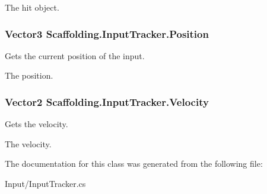 The hit object.\hypertarget{class_scaffolding_1_1_input_tracker_afc147aaaa6ab7d2406738cb97a01ef96}{
\subsubsection[{Position}]{\setlength{\rightskip}{0pt plus 5cm}Vector3 Scaffolding.\+Input\+Tracker.\+Position\hspace{0.3cm}{\ttfamily [get]}}}\label{class_scaffolding_1_1_input_tracker_afc147aaaa6ab7d2406738cb97a01ef96}


Gets the current position of the input. 

The position.\hypertarget{class_scaffolding_1_1_input_tracker_a2d7b1cd8114f6531a9640b5fde49f35e}{
\subsubsection[{Velocity}]{\setlength{\rightskip}{0pt plus 5cm}Vector2 Scaffolding.\+Input\+Tracker.\+Velocity\hspace{0.3cm}{\ttfamily [get]}}}\label{class_scaffolding_1_1_input_tracker_a2d7b1cd8114f6531a9640b5fde49f35e}


Gets the velocity. 

The velocity.

The documentation for this class was generated from the following file\+:\begin{DoxyCompactItemize}
\item 
Input/Input\+Tracker.\+cs\end{DoxyCompactItemize}
